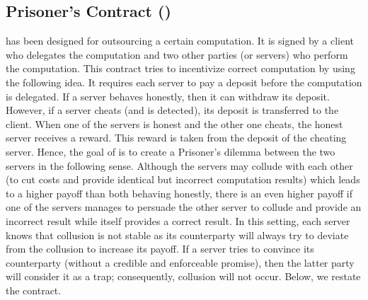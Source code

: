 

\subsection{Prisoner's Contract (\SCpc)}

\SCpc has been designed for outsourcing a certain computation. It is signed by a client who delegates the computation and two other parties  (or servers)  who perform the computation.  This contract tries to incentivize correct computation by using the following idea. It requires each server to pay a deposit before the computation is delegated. If a server behaves honestly, then it can withdraw its deposit. However, if a server cheats (and is detected), its deposit is transferred to the client. When one of the servers is honest and the other one cheats, the honest server receives a reward. This reward is taken from the deposit of the cheating server.  Hence, the goal of \SCpc is to create a Prisoner’s dilemma between the two servers in the following sense. Although the servers may collude with each other (to cut costs and provide identical but incorrect computation results) which leads to a higher payoff than both behaving honestly,  there is an even higher payoff if one of the servers manages to persuade the other server to collude and provide an incorrect result while itself provides a correct result. In this setting, each server knows that collusion is not stable as its counterparty will always try to deviate from the collusion to increase its payoff.  If a server tries to convince its counterparty (without a credible and enforceable promise), then the latter party will consider it as a trap; consequently, collusion will not occur. Below, we restate the contract. %


